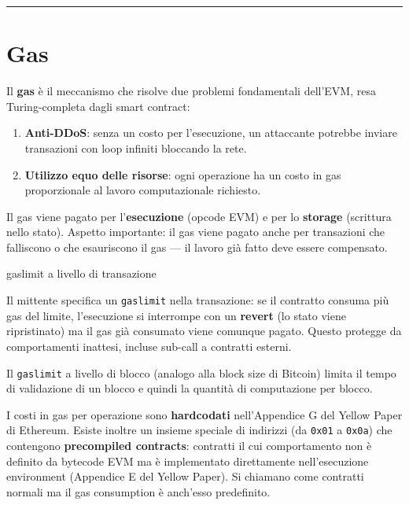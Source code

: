 \documentclass[
  italian,
  openany]{book}
\providecommand{\tightlist}{%
  \setlength{\itemsep}{0pt}\setlength{\parskip}{0pt}}
\begin{document}
\begin{center}\rule{0.5\linewidth}{0.5pt}\end{center}

\section{Gas}\label{gas}

Il \textbf{gas} è il meccanismo che risolve due problemi fondamentali
dell'EVM, resa Turing-completa dagli smart contract:

\begin{enumerate}
\def\labelenumi{\arabic{enumi}.}
\tightlist
\item
  \textbf{Anti-DDoS}: senza un costo per l'esecuzione, un attaccante
  potrebbe inviare transazioni con loop infiniti bloccando la rete.
\item
  \textbf{Utilizzo equo delle risorse}: ogni operazione ha un costo in
  gas proporzionale al lavoro computazionale richiesto.
\end{enumerate}

Il gas viene pagato per l'\textbf{esecuzione} (opcode EVM) e per lo
\textbf{storage} (scrittura nello stato). Aspetto importante: il gas
viene pagato anche per transazioni che falliscono o che esauriscono il
gas --- il lavoro già fatto deve essere compensato.

\begin{calloutwarning}{gaslimit a livello di transazione}

Il mittente specifica un \texttt{gaslimit} nella transazione: se il
contratto consuma più gas del limite, l'esecuzione si interrompe con un
\textbf{revert} (lo stato viene ripristinato) ma il gas già consumato
viene comunque pagato. Questo protegge da comportamenti inattesi,
incluse sub-call a contratti esterni.

\end{calloutwarning}

Il \texttt{gaslimit} a livello di blocco (analogo alla block size di
Bitcoin) limita il tempo di validazione di un blocco e quindi la
quantità di computazione per blocco.

I costi in gas per operazione sono \textbf{hardcodati} nell'Appendice G
del Yellow Paper di Ethereum. Esiste inoltre un insieme speciale di
indirizzi (da \texttt{0x01} a \texttt{0x0a}) che contengono
\textbf{precompiled contracts}: contratti il cui comportamento non è
definito da bytecode EVM ma è implementato direttamente nell'esecuzione
environment (Appendice E del Yellow Paper). Si chiamano come contratti
normali ma il gas consumption è anch'esso predefinito.
\end{document}
